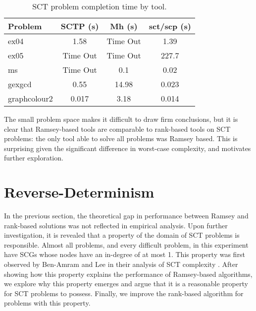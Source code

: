 \documentclass{LMCS}
\begin{document}
\begin{table}[!htp]
\vspace{0.17in}
\centering
\begin{tabular}{|l|c|c|c|}
\hline Problem & SCTP (s) & Mh (s) & sct/scp (s) \\
\hline ex04 \cite{BL07} & 1.58& Time Out & 1.39 \\
\hline ex05 \cite{BL07} & Time Out & Time Out & 227.7 \\
\hline ms \cite{Fred01} &  Time Out & 0.1 & 0.02 \\
\hline gexgcd \cite{Fred01} & 0.55 & 14.98 &  0.023 \\
\hline graphcolour2 \cite{Glen99} &  0.017 & 3.18 & 0.014 \\
\hline
\end{tabular}
\vspace{0.05in}
\caption{SCT problem completion time by tool.}\label{Table:SCT_Completion}
\end{table}

The small problem space makes it difficult to draw firm conclusions, but it is
clear that Ramsey-based tools are comparable to rank-based tools on SCT
problems: the only tool able to solve all problems was Ramsey based. This is
surprising given the significant difference in worst-case complexity, and
motivates further exploration.

\section{Reverse-Determinism}\label{Sect:Rev-Det}
In the previous section, the theoretical gap in performance between Ramsey and
rank-based solutions was not reflected in empirical analysis. Upon further
investigation, it is revealed that a property of the domain of SCT problems is
responsible. Almost all problems, and every difficult problem, in this
experiment have SCGs whose nodes have an in-degree of at most 1. This
property was first observed by Ben-Amram and Lee in their analysis of SCT
complexity \cite{BL07}.  After showing how this property explains the
performance of Ramsey-based algorithms, we explore why this property emerges and
argue that it is a reasonable property for SCT problems to possess. Finally, we
improve the rank-based algorithm for problems with this property.
\end{document}
